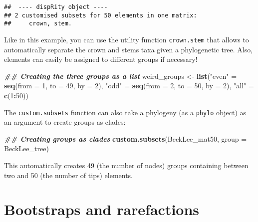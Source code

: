\documentclass[
]{book}
\newenvironment{Shaded}{\begin{snugshade}}{\end{snugshade}}
\newcommand{\AttributeTok}[1]{\textcolor[rgb]{0.13,0.29,0.53}{#1}}
\newcommand{\DecValTok}[1]{\textcolor[rgb]{0.00,0.00,0.81}{#1}}
\newcommand{\DocumentationTok}[1]{\textcolor[rgb]{0.56,0.35,0.01}{\textbf{\textit{#1}}}}
\newcommand{\FunctionTok}[1]{\textcolor[rgb]{0.13,0.29,0.53}{\textbf{#1}}}
\newcommand{\NormalTok}[1]{#1}
\newcommand{\OtherTok}[1]{\textcolor[rgb]{0.56,0.35,0.01}{#1}}
\newcommand{\SpecialCharTok}[1]{\textcolor[rgb]{0.81,0.36,0.00}{\textbf{#1}}}
\newcommand{\StringTok}[1]{\textcolor[rgb]{0.31,0.60,0.02}{#1}}
\begin{document}
\begin{verbatim}
##  ---- dispRity object ---- 
## 2 customised subsets for 50 elements in one matrix:
##     crown, stem.
\end{verbatim}

Like in this example, you can use the utility function \texttt{crown.stem} that allows to automatically separate the crown and stems taxa given a phylogenetic tree.
Also, elements can easily be assigned to different groups if necessary!

\begin{Shaded}
\begin{Highlighting}[]
\DocumentationTok{\#\# Creating the three groups as a list}
\NormalTok{weird\_groups }\OtherTok{\textless{}{-}} \FunctionTok{list}\NormalTok{(}\StringTok{"even"} \OtherTok{=} \FunctionTok{seq}\NormalTok{(}\AttributeTok{from =} \DecValTok{1}\NormalTok{, }\AttributeTok{to =} \DecValTok{49}\NormalTok{, }\AttributeTok{by =} \DecValTok{2}\NormalTok{),}
                      \StringTok{"odd"} \OtherTok{=} \FunctionTok{seq}\NormalTok{(}\AttributeTok{from =} \DecValTok{2}\NormalTok{, }\AttributeTok{to =} \DecValTok{50}\NormalTok{, }\AttributeTok{by =} \DecValTok{2}\NormalTok{),}
                      \StringTok{"all"} \OtherTok{=} \FunctionTok{c}\NormalTok{(}\DecValTok{1}\SpecialCharTok{:}\DecValTok{50}\NormalTok{))}
\end{Highlighting}
\end{Shaded}

The \texttt{custom.subsets} function can also take a phylogeny (as a \texttt{phylo} object) as an argument to create groups as clades:

\begin{Shaded}
\begin{Highlighting}[]
\DocumentationTok{\#\# Creating groups as clades}
\FunctionTok{custom.subsets}\NormalTok{(BeckLee\_mat50, }\AttributeTok{group =}\NormalTok{ BeckLee\_tree)}
\end{Highlighting}
\end{Shaded}

This automatically creates 49 (the number of nodes) groups containing between two and 50 (the number of tips) elements.

\hypertarget{bootstraps-and-rarefactions}{%
\section{Bootstraps and rarefactions}\label{bootstraps-and-rarefactions}}
\end{document}
